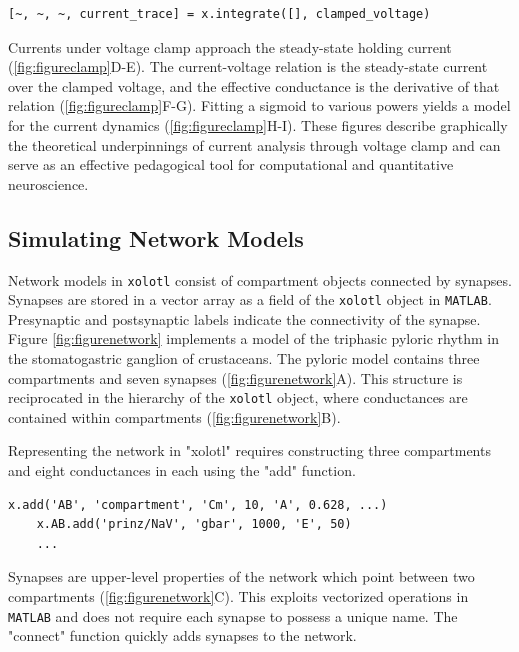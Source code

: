 \documentclass{frontiersSCNS} %
\begin{document}
\begin{lstlisting}[style=Matlab-editor]
	[~, ~, ~, current_trace] = x.integrate([], clamped_voltage)
\end{lstlisting}

Currents under voltage clamp approach the steady-state holding current (\ref{fig:figureclamp}D-E). The current-voltage relation is the steady-state current over the clamped voltage, and the effective conductance is the derivative of that relation (\ref{fig:figureclamp}F-G). Fitting a sigmoid to various powers yields a model for the current dynamics (\ref{fig:figureclamp}H-I). These figures describe graphically the theoretical underpinnings of current analysis through voltage clamp and can serve as an effective pedagogical tool for computational and quantitative neuroscience.

%
%
%
%
%
%

\subsection{Simulating Network Models}

Network models in \texttt{xolotl} consist of compartment objects connected by synapses. Synapses are stored in a vector array as a field of the \texttt{xolotl} object in \texttt{MATLAB}. Presynaptic and postsynaptic labels indicate the connectivity of the synapse. Figure \ref{fig:figurenetwork} implements a model of the triphasic pyloric rhythm in the stomatogastric ganglion of crustaceans. The pyloric model contains three compartments and seven synapses (\ref{fig:figurenetwork}A). This structure is reciprocated in the hierarchy of the \texttt{xolotl} object, where conductances are contained within compartments (\ref{fig:figurenetwork}B).

Representing the network in "xolotl" requires constructing three compartments and eight conductances in each using the "add" function. 

\begin{lstlisting}[style=Matlab-editor]
	x.add('AB', 'compartment', 'Cm', 10, 'A', 0.628, ...)
	x.AB.add('prinz/NaV', 'gbar', 1000, 'E', 50)
	...
\end{lstlisting}

Synapses are upper-level properties of the network which point between two compartments (\ref{fig:figurenetwork}C). This exploits vectorized operations in \texttt{MATLAB} and does not require each synapse to possess a unique name. The "connect" function quickly adds synapses to the network.
\end{document}
